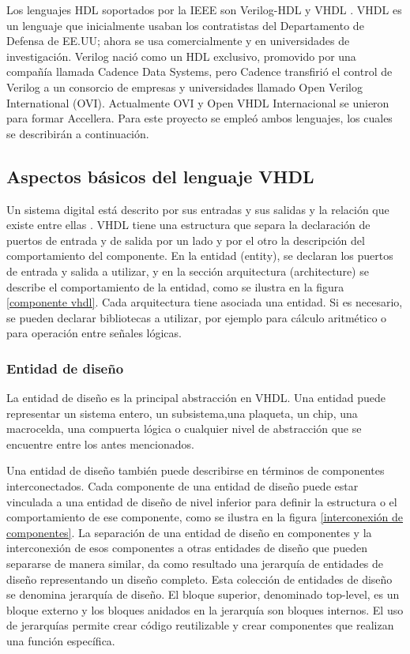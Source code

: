 Los lenguajes HDL soportados por la IEEE son Verilog-HDL y VHDL \citep{ieee_std} \citep{ieee_pkg}. VHDL es un lenguaje que inicialmente usaban los contratistas del Departamento de Defensa de EE.UU; ahora se usa comercialmente y en universidades de investigación. Verilog nació como un HDL exclusivo, promovido por una compañía llamada Cadence Data Systems, pero Cadence transfirió el control de Verilog a un consorcio de empresas y universidades llamado Open Verilog International (OVI). Actualmente OVI y Open VHDL Internacional se unieron para formar Accellera. Para este proyecto se empleó ambos lenguajes, los cuales se describirán a continuación.


\subsection{Aspectos básicos del lenguaje VHDL}
Un sistema digital está descrito por sus entradas y sus salidas y la relación que existe entre ellas \citep{intro_VHDL}. VHDL tiene una estructura que separa la declaración de puertos de entrada y de salida por un lado y por el otro la descripción del comportamiento del componente.
En la entidad (entity), se declaran los puertos de entrada y salida a utilizar, y en la sección arquitectura (architecture) se describe el comportamiento de la entidad, como se ilustra en la figura \ref{componente vhdl}. Cada arquitectura tiene asociada una entidad. Si es necesario, se pueden declarar bibliotecas a utilizar, por ejemplo para cálculo aritmético o para operación entre señales lógicas.

\subsubsection{Entidad de diseño}
La entidad de diseño es la principal abstracción en VHDL. Una entidad puede representar un sistema entero, un subsistema,una plaqueta, un chip, una macrocelda, una compuerta lógica o cualquier nivel de abstracción que se encuentre entre los antes mencionados.

Una entidad de diseño también puede describirse en términos de componentes interconectados. Cada componente de una entidad de diseño puede estar vinculada a una entidad de diseño de nivel inferior para definir la estructura o el comportamiento de ese componente, como se ilustra en la figura \ref{interconexión de componentes}. La separación de una entidad de diseño en componentes y la interconexión de esos componentes a otras entidades de diseño que pueden separarse de manera similar, da como resultado una jerarquía de entidades de diseño representando un diseño completo. Esta colección de entidades de diseño se denomina jerarquía de diseño. El bloque superior, denominado top-level, es un bloque externo y los bloques anidados en la jerarquía son bloques internos. El uso de jerarquías permite crear código reutilizable y crear componentes que realizan una función específica.

